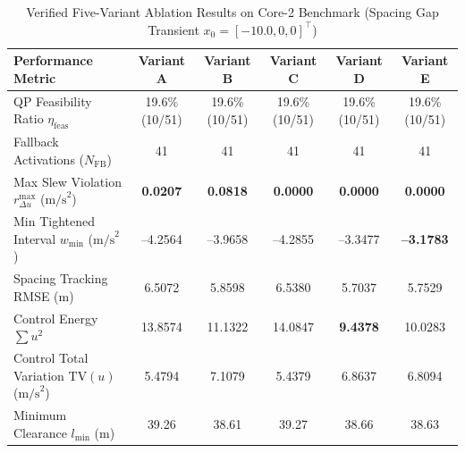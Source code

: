 \documentclass[journal]{IEEEtran}
\begin{document}
\begin{table}[t]
\centering
\caption{Verified Five-Variant Ablation Results on Core-2 Benchmark (Spacing Gap Transient $x_0 = [-10.0, 0, 0]^\top$)}
\label{tab:ablation_core2}
\begin{tabular}{lccccc}
\toprule
\textbf{Performance Metric} & \textbf{Variant A} & \textbf{Variant B} & \textbf{Variant C} & \textbf{Variant D} & \textbf{Variant E} \\
\midrule
QP Feasibility Ratio $\eta_{\mathrm{feas}}$ & 19.6\% (10/51) & 19.6\% (10/51) & 19.6\% (10/51) & 19.6\% (10/51) & 19.6\% (10/51) \\
Fallback Activations ($N_{\mathrm{FB}}$) & 41 & 41 & 41 & 41 & 41 \\
Max Slew Violation $r_{\Delta u}^{\max}$ ($\text{m/s}^2$) & \textbf{0.0207} & \textbf{0.0818} & \textbf{0.0000} & \textbf{0.0000} & \textbf{0.0000} \\
Min Tightened Interval $w_{\min}$ ($\text{m/s}^2$) & --4.2564 & --3.9658 & --4.2855 & --3.3477 & \textbf{--3.1783} \\
Spacing Tracking RMSE (m) & 6.5072 & 5.8598 & 6.5380 & 5.7037 & 5.7529 \\
Control Energy $\sum u^2$ & 13.8574 & 11.1322 & 14.0847 & \textbf{9.4378} & 10.0283 \\
Control Total Variation $\mathrm{TV}(u)$ ($\text{m/s}^2$) & 5.4794 & 7.1079 & 5.4379 & 6.8637 & 6.8094 \\
Minimum Clearance $l_{\min}$ (m) & 39.26 & 38.61 & 39.27 & 38.66 & 38.63 \\
\bottomrule
\end{tabular}
\end{table}
\end{document}

